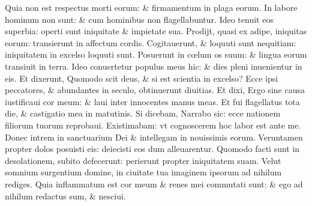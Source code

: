 \documentclass[a5paper,10pt]{book}
\def\oe{œ}
\begin{document}
\begin{multicols*}{2}
\newline \color{red} Q\color{black}uia non est respectus morti eorum: \& firmamentum in plaga eorum.
\newline \color{red} I\color{black}n labore hominum non sunt: \& cum hominibus non flagellabuntur.
\newline \color{red} I\color{black}deo tenuit eos superbia: operti sunt iniquitate \& impietate sua.
\newline \color{red} P\color{black}rodijt, quasi ex adipe, iniquitas eorum: transierunt in affectum cordis.
\newline \color{red} C\color{black}ogitauerunt, \& loquuti sunt nequitiam: iniquitatem in excelso loquuti sunt.
\newline \color{red} P\color{black}osuerunt in c\oe lum os suum: \& lingua eorum transiuit in terra.
\newline \color{red} I\color{black}deo conuertetur populus meus hic: \& dies pleni inuenientur in eis.
\newline \color{red} E\color{black}t dixerunt, Quomodo scit deus, \& si est scientia in excelso?
\newline \color{red} E\color{black}cce ipsi peccatores, \& abundantes in seculo, obtinuerunt diuitias.
\newline \color{red} E\color{black}t dixi, Ergo sine causa iustificaui cor meum: \& laui inter innocentes manus meas.
\newline \color{red} E\color{black}t fui flagellatus tota die, \& castigatio mea in matutinis.
\newline \color{red} S\color{black}i dicebam, Narrabo sic: ecce nationem filiorum tuorum reprobaui.
\newline \color{red} E\color{black}xistimabam: vt cognoscerem hoc labor est ante me.
\newline \color{red} D\color{black}onec intrem in sanctuarium Dei \& intellegam in nouissimis eorum.
\newline \color{red} V\color{black}eruntamen propter dolos posuisti eis: deiecisti eos dum alleuarentur.
\newline \color{red} Q\color{black}uomodo facti sunt in desolationem, subito defecerunt: perierunt propter iniquitatem suam.
\newline \color{red} V\color{black}elut somnium surgentium domine, in ciuitate tua imaginem ipsorum ad nihilum rediges.
\newline \color{red} Q\color{black}uia inflammatum est cor meum \& renes mei commutati sunt: \& ego ad nihilum redactus sum, \& nesciui.

\end{multicols*}
\end{document}
